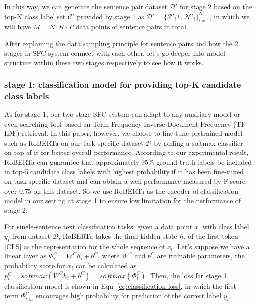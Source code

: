 \documentclass[letterpaper]{article} %
\begin{document}
  In  this  way,  we  can generate the sentence pair dataset $\mathcal{D'}$ for
  stage  2 based on the top-K class label set $\mathcal{C'}$ provided by stage 1
  as   $\mathcal{D'}=\{\mathcal{P'}_{i}\cup   \mathcal{N'}_{i}\}_{i=1}^{N}$,  in
  which we will have $M=N\cdot K\cdot P$ data points of sentence pairs in total.

  After  explaining the data sampling principle for sentence pairs and how the 2
  stages  in  SFC  system  connect  with  each other, let's go deeper into model
  structure within these two stages respectively to see how it works.

  \subsubsection*{
    stage 1: classification model for providing top-K candidate class labels
  }

  As for  stage  1,  our  two-stage SFC  system  can adapt to any auxiliary model or even
  searching  tool  based  on  Term Frequency-Inverse Document Frequency (TF-IDF)
  retrieval.  In  this  paper,  however,  we  choose to fine-tune pretrained model such as RoBERTa on our
  task-specific  dataset $\mathcal{D}$ by adding a softmax classifier on top of
  it for better
  overall  performance.  According  to  our  experimental  result,  RoBERTa  can
  guarantee  that  approximately  95\%  ground  truth labels be included in top-5
  candidate  class  labels  with  highest  probability if it has been fine-tuned on
  task-specific  dataset and can obtain a well performance measured by F-score over
  0.75 on this dataset.  So  we use RoBERTa as the encoder of classification model in our setting at
  stage 1 to ensure low limitation for the performance of stage 2.

  For single-sentence text classification tasks, given a data point $x_{i}$ with
  class  label  $y_{i}$  from  dataset  $\mathcal{D}$, RoBERTa takes the final
  hidden  state  $h_{i}$  of the first token [CLS] as the representation for the
  whole   sequence  of  $x_{i}$.  Let's  suppose  we  have  a  linear  layer  as
  ${\Phi}^C_{i}=W^Ch_{i}+b^C$,  where  $W^C$ and $b^C$ are trainable parameters,
  the    probability    score    for    $x_{i}$    can    be    calculated    as
  $p^C_{i}=softmax(W^Ch_{i}+b^C)=softmax({\Phi}^C_{i})$.   Then,  the  loss  for
  stage 1 classification model is shown in Equ. \ref{eq:classification loss}, in
  which  the  first  term  $\varPhi_{i,y_{i}}^C$ encourages high probability for
  prediction of the correct label $y_{i}$.
\end{document}
